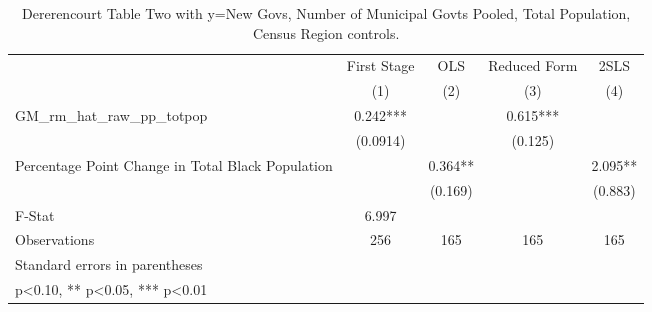\begin{table}[htbp]\centering
\def\sym#1{\ifmmode^{#1}\else\(^{#1}\)\fi}
\caption{Dererencourt Table Two with y=New Govs, Number of Municipal Govts  Pooled, Total Population, Census Region controls.}
\begin{tabular}{l*{4}{c}}
\toprule
                    & First Stage   &         OLS   &Reduced Form   &        2SLS   \\
                    &\multicolumn{1}{c}{(1)}   &\multicolumn{1}{c}{(2)}   &\multicolumn{1}{c}{(3)}   &\multicolumn{1}{c}{(4)}   \\
\midrule
GM\_rm\_hat\_raw\_pp\_totpop&       0.242***&               &       0.615***&               \\
                    &    (0.0914)   &               &     (0.125)   &               \\
\addlinespace
Percentage Point Change in Total Black Population&               &       0.364** &               &       2.095** \\
                    &               &     (0.169)   &               &     (0.883)   \\
\midrule
F-Stat              &       6.997   &               &               &               \\
Observations        &         256   &         165   &         165   &         165   \\
\bottomrule
\multicolumn{5}{l}{\footnotesize Standard errors in parentheses}\\
\multicolumn{5}{l}{\footnotesize * p<0.10, ** p<0.05, *** p<0.01}\\
\end{tabular}
\end{table}
